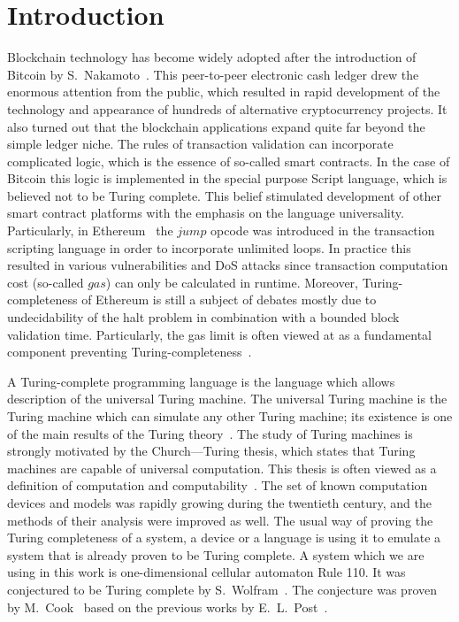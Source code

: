 \documentclass[runningheads]{llncs}
\begin{document}
    \section{Introduction}
    Blockchain technology has become widely adopted after the introduction of
    Bitcoin by S.~Nakamoto~\cite{nakamoto2008bitcoin}. This peer-to-peer
    electronic cash ledger drew the enormous attention from the public, which
    resulted in rapid development of the technology and appearance of hundreds
    of alternative cryptocurrency projects. It also turned out that the
    blockchain applications expand quite far beyond the simple ledger niche. The
    rules of transaction validation can incorporate complicated logic, which is
    the essence of so-called smart contracts. In the case of Bitcoin this logic
    is implemented in the special purpose Script language, which is believed not
    to be Turing complete. This belief stimulated development of other smart
    contract platforms with the emphasis on the language universality.
    Particularly, in Ethereum~\cite{buterin2014next} the $jump$ opcode was
    introduced in the transaction scripting language in order to incorporate
    unlimited loops.  In practice this resulted in various vulnerabilities and
    DoS attacks \cite{atzei2017survey} since transaction computation cost
    (so-called $gas$) can only be calculated in runtime.
    Moreover, Turing-completeness of Ethereum is
    still a subject of debates mostly due to undecidability of the halt problem
    in combination with a bounded block validation time. Particularly, the gas
    limit is often viewed at as a fundamental component preventing
    Turing-completeness~\cite{miller2016ethereum}.

    A Turing-complete programming language is the language which allows
    description of the universal Turing machine. The universal Turing machine is
    the Turing machine which can simulate any other Turing machine; its
    existence is one of the main results of the Turing
    theory~\cite{turing1937computable}. The study of Turing machines is strongly
    motivated by the Church---Turing thesis, which states that Turing machines
    are capable of universal computation. This thesis is often viewed as a
    definition of computation and computability~\cite{turing1939systems}. The
    set of known computation devices and models was rapidly growing during the
    twentieth century, and the methods of their analysis were improved as well.
    The usual way of proving the Turing completeness of a system,
    a device or a language is using it to emulate a system that is already
    proven to be Turing complete. A system which we are using in this work is 
    one-dimensional cellular automaton Rule 110. It was conjectured to
    be Turing complete by S.~Wolfram~\cite{wolfram1986theory}. The conjecture
    was proven by M.~Cook~\cite{cook2004universality} based on the previous
    works by E.~L.~Post~\cite{post1943formal}.
\end{document}
